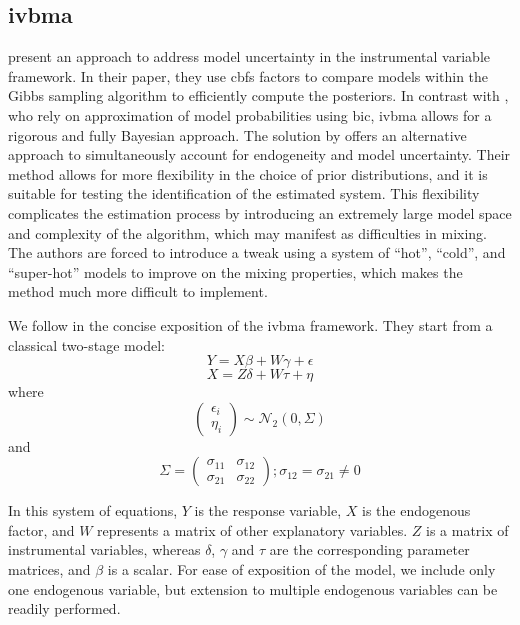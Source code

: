 \documentclass[a4paper,11pt]{article}
\begin{document}
\subsection*{\ac{ivbma}}
\citet{KarlLenkoski2012} present an approach to address model uncertainty in the instrumental variable framework. In their paper, they use \acp{cbf} factors to compare models within the Gibbs sampling algorithm to efficiently compute the posteriors. In contrast with \citet{lenkoski2014two}, who rely on approximation of model probabilities using \ac{bic}, \ac{ivbma} allows for a rigorous and fully Bayesian approach. The solution by \citet{koop2012bayesian} offers an alternative approach to simultaneously account for endogeneity and model uncertainty. Their method allows for more flexibility in the choice of prior distributions, and it is suitable for testing the identification of the estimated system. This flexibility complicates the estimation process by introducing an extremely large model space and complexity of the algorithm, which may manifest as difficulties in mixing. The authors are forced to introduce a tweak using a system of ``hot'', ``cold'', and ``super-hot'' models to improve on the mixing properties, which makes the method much more difficult to implement.

We follow \citet{KarlLenkoski2012} in the concise exposition of the \ac{ivbma} framework. They start from a classical two-stage model:
\begin{equation}
\label{eq:ivbma1}
{Y} = {X} \beta + {W} \gamma + {\epsilon}
\end{equation}
%
\begin{equation}
\label{eq:ivbma2}
{X} = {Z} {\delta} + {W} {\tau} + {\eta}
\end{equation}
%
where
%
\begin{equation}
\begin{pmatrix}
\epsilon_{i} \\
\eta_{i}
\end{pmatrix}
\sim \mathcal{N}_{2}(0, {\Sigma})
\end{equation}
%
and
%
\begin{equation}
{\Sigma} = 
\begin{pmatrix}
 \sigma_{11} & \sigma_{12} \\
 \sigma_{21} & \sigma_{22}
\end{pmatrix}
; \sigma_{12} = \sigma_{21} \neq 0
\end{equation}

In this system of equations, ${Y}$ is the response variable, ${X}$ is the endogenous factor, and ${W}$ represents a matrix of other explanatory variables. ${Z}$ is a matrix of instrumental variables, whereas ${\delta}$, ${\gamma}$ and ${\tau}$ are the corresponding parameter matrices, and $\beta$ is a scalar. For ease of exposition of the model, we include only one endogenous variable, but extension to multiple endogenous variables can be readily performed.
\end{document}
